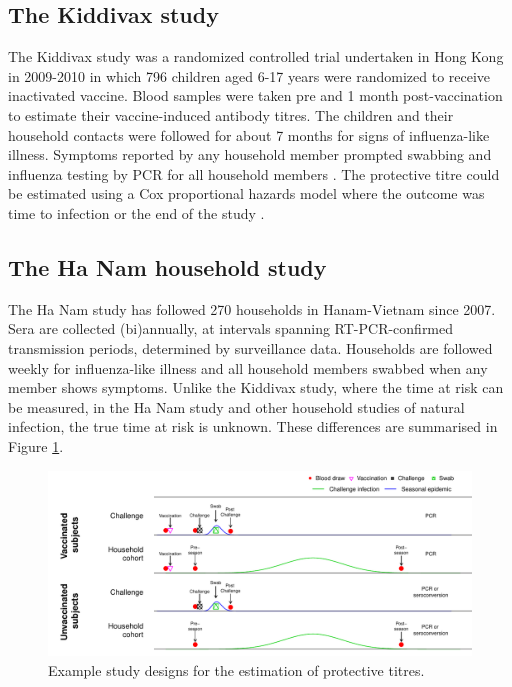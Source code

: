 \documentclass[12pt]{article}
\begin{document}
\pagebreak
\subsection{The Kiddivax study}

The Kiddivax study was a randomized controlled trial undertaken in Hong Kong in 2009-2010 in which 796 children aged 6-17 years were randomized to receive inactivated vaccine. Blood samples were taken pre and 1 month post-vaccination to estimate their vaccine-induced antibody titres.  The children and their household contacts were followed for about 7 months for signs of influenza-like illness. Symptoms reported by any household member prompted swabbing and influenza testing by PCR for all household members \citep{Cowling;2013}. The protective titre could be estimated using a Cox proportional hazards model where the outcome was time to infection or the end of the study \citep{Ng;2013}.

\subsection{The Ha Nam household study}
The Ha Nam study has followed 270 households in Hanam-Vietnam since 2007. Sera are collected (bi)annually, at intervals spanning RT-PCR-confirmed transmission periods, determined by surveillance data. Households are followed weekly for influenza-like illness and all household members swabbed when any member shows symptoms. Unlike the Kiddivax study, where the time at risk can be measured, in the Ha Nam study and other household studies of natural infection, the true time at risk is unknown. These differences are summarised in Figure \ref{Studies}.

\begin{figure}[htp]
	\centering
	\includegraphics[width=\linewidth]{../fig-studies/fig-studies.pdf}
	\caption{\footnotesize
	Example study designs for the estimation of protective titres.
}
\label{Studies}
\end{figure}
\end{document}
